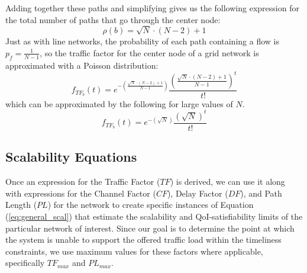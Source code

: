 Adding together these paths and simplifying gives us the following expression for the total number of paths that go through the center node: 
\begin{equation}
	\rho(b) = \sqrt{N} \cdot (N-2) + 1
\end{equation}
Just as with line networks, the probability of each path containing a flow is $p_f = \frac{1}{N-1}$, so the traffic factor for the center node of a grid network is approximated with a Poisson distribution:
\begin{equation*}
	f_{TF_b}(t) = e^{-(\frac{\sqrt{N}\cdot(N-2)+1}{N-1})}\frac{(\frac{\sqrt{N}\cdot(N-2)+1}{N-1})^{t}}{t!}
\end{equation*}
which can be approximated by the following for large values of $N$.  
\begin{equation*}
	f_{TF_b}(t) = e^{-(\sqrt{N})}\frac{(\sqrt{N})^{t}}{t!}
\end{equation*}



\subsection{Scalability Equations}

Once an expression for the Traffic Factor ($TF$) is derived, we can use it along with expressions for the Channel Factor ($CF$), Delay Factor ($DF$), and Path Length ($PL$) for the network to create specific instances of Equation (\ref{eq:general_scal}) that estimate the scalability and QoI-satisfiability limits of the particular network of interest.  Since our goal is to determine the point at which the system is unable to support the offered traffic load within the timeliness constraints, we use maximum values for these factors where applicable, specifically $TF_{max}$ and $PL_{max}$.  

